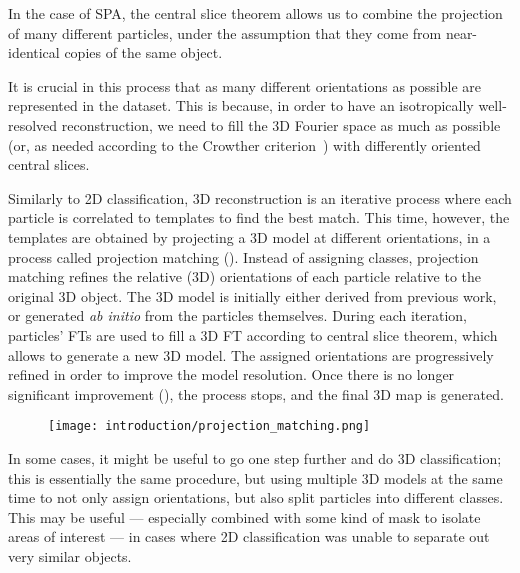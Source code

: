 In the case of SPA, the central slice theorem allows us to combine the projection of many different particles, under the assumption that they come from near-identical copies of the same object.

It is crucial in this process that as many different orientations as possible are represented in the dataset.
This is because, in order to have an isotropically well-resolved reconstruction, we need to fill the 3D Fourier space as much as possible (or, as needed according to the Crowther criterion~\cite{crowtherReconstructionThreedimensionalStructure1997}) with differently oriented central slices.

Similarly to 2D classification, 3D reconstruction is an iterative process where each particle is correlated to templates to find the best match.
This time, however, the templates are obtained by projecting a 3D model at different orientations, in a process called projection matching ().
Instead of assigning classes, projection matching refines the relative (3D) orientations of each particle relative to the original 3D object.
The 3D model is initially either derived from previous work, or generated \textit{ab initio} from the particles themselves.
During each iteration, particles' FTs are used to fill a 3D FT according to central slice theorem, which allows to generate a new 3D model.
The assigned orientations are progressively refined in order to improve the model resolution.
Once there is no longer significant improvement (), the process stops, and the final 3D map is generated.

\begin{figure}
    \centering
    \texttt{[image: introduction/projection\_matching.png]}
    \label{fig:em_projection_matching}
\end{figure}

In some cases, it might be useful to go one step further and do 3D classification; this is essentially the same procedure, but using multiple 3D models at the same time to not only assign orientations, but also split particles into different classes.
This may be useful --- especially combined with some kind of mask to isolate areas of interest --- in cases where 2D classification was unable to separate out very similar objects.

